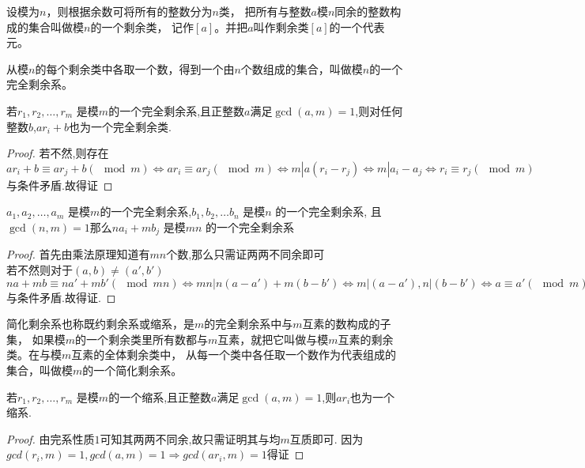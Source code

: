 \begin{definition}
  设模为$n$，则根据余数可将所有的整数分为$n$类，
  把所有与整数$a$模$n$同余的整数构成的集合叫做模$n$的一个剩余类，
  记作$[a]$。并把$a$叫作剩余类$[a]$的一个代表元。
\end{definition}

\begin{definition}
  从模$n$的每个剩余类中各取一个数，得到一个由$n$个数组成的集合，叫做模$n$的一个完全剩余系。
\end{definition}

\begin{proposition}
  若$r_1,r_2,\dots ,r_m$ 是模$m$的一个完全剩余系,且正整数$a$满足$\gcd(a,m)=1$,则对任何整数$b$,$ar_i+b$也为一个完全剩余类.
\end{proposition}

\begin{proof}
  若不然,则存在$ar_i+b \equiv ar_j+b (\mod m) \iff ar_i \equiv ar_j (\mod m) \iff m|a(r_i-r_j) \iff m|a_i-a_j \iff r_i \equiv r_j (\mod m)$与条件矛盾.故得证
\end{proof}


\begin{proposition}
  $a_1,a_2,\dots,a_m$ 是模$m$的一个完全剩余系,$b_1,b_2,\dots b_n$ 是模$n$ 的一个完全剩余系, 
  且$\gcd(n,m)=1$那么$na_i+mb_j$ 是模$mn$ 的一个完全剩余系
\end{proposition}

\begin{proof}
  首先由乘法原理知道有$mn$个数,那么只需证两两不同余即可\\
若不然则对于$(a,b)\neq(a',b')$
$na+mb \equiv na'+mb' (\mod mn) \iff mn|n(a-a')+m(b-b') \iff
m|(a-a'),n|(b-b') \iff a \equiv a' (\mod m),b \equiv b' (\mod n)$ 与条件矛盾.故得证.
\end{proof}

\begin{definition}
  简化剩余系也称既约剩余系或缩系，是$m$的完全剩余系中与$m$互素的数构成的子集，
  如果模$m$的一个剩余类里所有数都与$m$互素，就把它叫做与模$m$互素的剩余类。在与模$m$互素的全体剩余类中，
  从每一个类中各任取一个数作为代表组成的集合，叫做模$m$的一个简化剩余系。
\end{definition}

\begin{proposition}
  若$r_1,r_2,\dots ,r_m$ 是模$m$的一个缩系,且正整数$a$满足$\gcd(a,m)=1$,则$ar_i$也为一个缩系.
\end{proposition}


\begin{proof}
  由完系性质$1$可知其两两不同余,故只需证明其与均$m$互质即可.
因为$gcd(r_i,m)=1,gcd(a,m)=1\Rightarrow gcd(ar_i,m)=1$得证
\end{proof}

